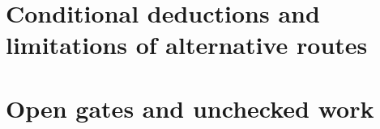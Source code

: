 \documentclass[11pt]{article}
\theoremstyle{remark}\newtheorem{remark}[theorem]{Remark}
\begin{document}

















\part{Conditional deductions and limitations of alternative routes}


\part{Open gates and unchecked work}
\end{document}
